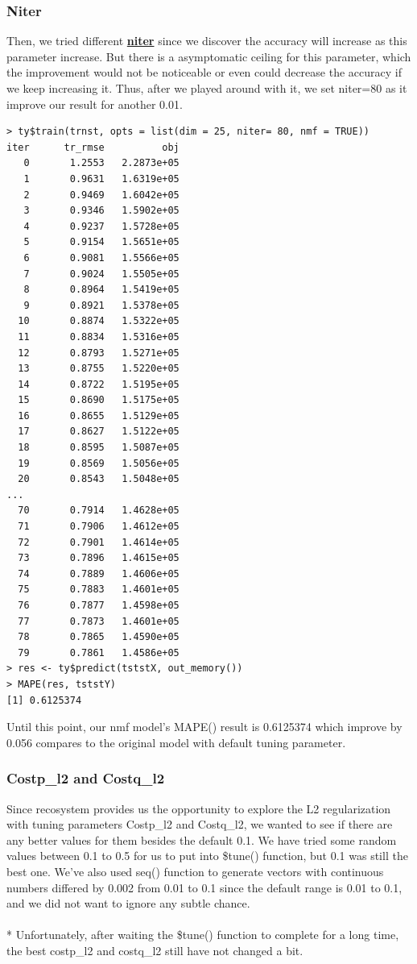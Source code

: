 \documentclass[11pt]{article}
\newcommand\tab[1][0.5cm]{\hspace*{#1}}
\begin{document}
\subsubsection{Niter}
\tab{}Then, we tried different \textbf{\underline{niter}} since we discover the accuracy will increase as this parameter increase. But there is a asymptomatic ceiling for this parameter, which the improvement would not be noticeable or even could decrease the accuracy if we keep increasing it. Thus, after we played around with it, we set niter=80 as it improve our result for another 0.01.
\begin{verbatim}
> ty$train(trnst, opts = list(dim = 25, niter= 80, nmf = TRUE))
iter      tr_rmse          obj
   0       1.2553   2.2873e+05
   1       0.9631   1.6319e+05
   2       0.9469   1.6042e+05
   3       0.9346   1.5902e+05
   4       0.9237   1.5728e+05
   5       0.9154   1.5651e+05
   6       0.9081   1.5566e+05
   7       0.9024   1.5505e+05
   8       0.8964   1.5419e+05
   9       0.8921   1.5378e+05
  10       0.8874   1.5322e+05
  11       0.8834   1.5316e+05
  12       0.8793   1.5271e+05
  13       0.8755   1.5220e+05
  14       0.8722   1.5195e+05
  15       0.8690   1.5175e+05
  16       0.8655   1.5129e+05
  17       0.8627   1.5122e+05
  18       0.8595   1.5087e+05
  19       0.8569   1.5056e+05
  20       0.8543   1.5048e+05
...
  70       0.7914   1.4628e+05
  71       0.7906   1.4612e+05
  72       0.7901   1.4614e+05
  73       0.7896   1.4615e+05
  74       0.7889   1.4606e+05
  75       0.7883   1.4601e+05
  76       0.7877   1.4598e+05
  77       0.7873   1.4601e+05
  78       0.7865   1.4590e+05
  79       0.7861   1.4586e+05
> res <- ty$predict(tststX, out_memory())
> MAPE(res, tststY)
[1] 0.6125374
\end{verbatim}
\tab{}Until this point, our nmf model's MAPE() result is 0.6125374 which improve by 0.056 compares to the original model with default tuning parameter. 

\subsubsection{Costp\_l2 and Costq\_l2}
\tab{}Since recosystem provides us the opportunity to explore the L2 regularization with tuning parameters Costp\_l2 and Costq\_l2, we wanted to see 
if there are any better values for them besides the default 0.1. 
We have tried some random values between 0.1 to 0.5 for us to put into \$tune() function, but 0.1 was still the best one. 
We've also used seq() function to generate vectors with continuous numbers differed by 0.002 from 0.01 to 0.1 since the default range is 0.01 to 0.1, and we 
did not want to ignore any subtle chance.
\\\\*
\tab{}Unfortunately, after waiting the \$tune() function to complete for a long time, the best costp\_l2 and costq\_l2 still have not changed a bit.
\end{document}
